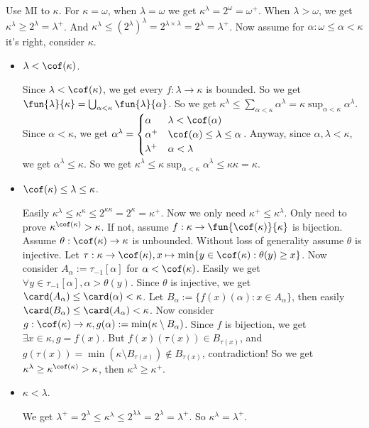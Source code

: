 \documentclass[a5paper]{ctexart}
\begin{document}
\begin{solution}
  Use MI to \(\kappa\). For \(\kappa=\omega\), when \(\lambda = \omega\) we get \(\kappa^\lambda=2^\omega=\omega^+\). 
  When \(\lambda>\omega\), we get \(\kappa^\lambda \geq 2^\lambda=\lambda^+\). And \(\kappa^\lambda \leq (2^\lambda)^\lambda=2^{\lambda \times \lambda}=2^\lambda=\lambda^+\). 
  Now assume for \(\alpha:\omega \leq \alpha <\kappa\) it's right, consider \(\kappa\). 
  \begin{itemize}
    \item \(\lambda<\cof( \kappa)\). 

      Since \(\lambda < \cof( \kappa)\), we get every \(f:\lambda \to \kappa\) is bounded. 
      So we get \(\fun{\lambda}{\kappa}=\bigcup_{\alpha<\kappa}\fun{\lambda}{\alpha}\). 
      So we get \(\kappa^\lambda \leq \sum_{\alpha<\kappa}\alpha^\lambda=\kappa \sup_{\alpha<\kappa}\alpha^\lambda\).
      Since \(\alpha<\kappa\), we get \(\alpha^\lambda=\begin{cases}
      \alpha & \lambda < \cof( \alpha)\\
      \alpha^+ & \cof( \alpha)\leq \lambda \leq \alpha\\
      \lambda^+ & \alpha<\lambda
      \end{cases}\). Anyway, since \(\alpha,\lambda<\kappa\), we get \(\alpha^\lambda \leq \kappa\). 
      So we get \(\kappa^\lambda \leq \kappa \sup_{\alpha<\kappa}\alpha^\lambda \leq \kappa \kappa = \kappa\). 
    \item \(\cof( \kappa)\leq \lambda \leq \kappa\). 

      Easily \(\kappa^\lambda \leq \kappa^\kappa \leq 2^{\kappa \kappa}=2^\kappa = \kappa^+\). Now we only need \(\kappa^+ \leq \kappa^\lambda\). 
      Only need to prove \(\kappa^{\cof( \kappa)} >\kappa\). 
      If not, assume \(f:\kappa \to \fun{\cof( \kappa)}{\kappa}\) is bijection. 
      Assume \(\theta:\cof( \kappa) \to \kappa\) is unbounded. Without loss of generality assume \(\theta\) is injective.  Let \(\tau:\kappa \to \cof( \kappa),x \mapsto \min\{ y \in \cof( \kappa):\theta( y)\geq x\}\). 
      Now consider \(A_\alpha :=\tau_{-1}[ \alpha]\) for \(\alpha < \cof( \kappa)\). 
      Easily we get \(\forall y \in \tau_{-1}[ \alpha],\alpha > \theta( y)\). Since \(\theta\) is injective, we get \(\card( A_\alpha) \leq \card( \alpha) <\kappa\). 
      Let \(B_\alpha:=\{f(x)( \alpha):x \in A_\alpha\}\), then easily \(\card( B_\alpha) \leq \card( A_\alpha)<\kappa\). 
      Now consider \(g:\cof( \kappa)\to \kappa,g( \alpha):=\min( \kappa \setminus B_\alpha)\). 
      Since \(f\) is bijection, we get \(\exists x \in \kappa,g=f( x)\). 
      But \(f( x)( \tau( x)) \in B_{\tau( x)}\), and \(g( \tau( x))=\min( \kappa \setminus B_{\tau( x)}) \notin B_{\tau( x)}\), contradiction! 
      So we get \(\kappa^\lambda \geq \kappa^{\cof( \kappa)} > \kappa\), then \(\kappa^\lambda \geq \kappa^+\). 
    \item \(\kappa<\lambda\). 

      We get \(\lambda^+=2^\lambda \leq \kappa^\lambda \leq 2^{\lambda \lambda}=2^\lambda =\lambda^+\). 
      So \(\kappa^\lambda = \lambda^+\). 
  \end{itemize}
\end{solution}
\end{document}
